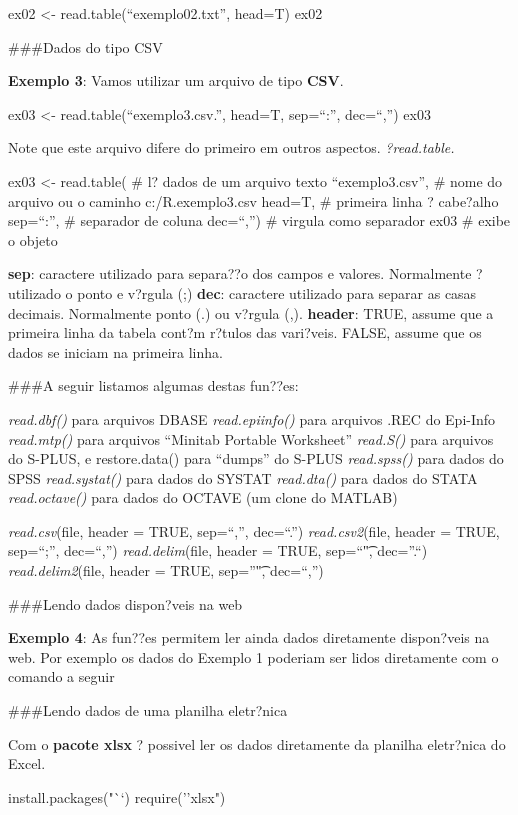 \documentclass[]{book}
\begin{document}
ex02 \textless{}- read.table(``exemplo02.txt'', head=T)
ex02

\#\#\#Dados do tipo CSV

\textbf{Exemplo 3}: Vamos utilizar um arquivo de tipo \textbf{CSV}.

ex03 \textless{}- read.table(``exemplo3.csv.'', head=T, sep=``:'', dec=``,'')
ex03

Note que este arquivo difere do primeiro em outros aspectos.
\emph{?read.table.}

ex03 \textless{}- read.table( \# l? dados de um arquivo texto
``exemplo3.csv'', \# nome do arquivo ou o caminho c:/R.exemplo3.csv
head=T, \# primeira linha ? cabe?alho
sep=``:'', \# separador de coluna
dec=``,'') \# virgula como separador
ex03 \# exibe o objeto

\textbf{sep}: caractere utilizado para separa??o dos campos e valores. Normalmente ? utilizado o ponto e v?rgula (;)
\textbf{dec}: caractere utilizado para separar as casas decimais. Normalmente ponto (.) ou v?rgula (,).
\textbf{header}: TRUE, assume que a primeira linha da tabela cont?m r?tulos das vari?veis. FALSE, assume que os dados se iniciam na primeira linha.

\#\#\#A seguir listamos algumas destas fun??es:

\emph{read.dbf()} para arquivos DBASE
\emph{read.epiinfo()} para arquivos .REC do Epi-Info
\emph{read.mtp()} para arquivos ``Minitab Portable Worksheet''
\emph{read.S()} para arquivos do S-PLUS, e restore.data() para ``dumps'' do S-PLUS
\emph{read.spss()} para dados do SPSS
\emph{read.systat()} para dados do SYSTAT
\emph{read.dta()} para dados do STATA
\emph{read.octave()} para dados do OCTAVE (um clone do MATLAB)

\emph{read.csv}(file, header = TRUE, sep=``,'', dec=``.'')
\emph{read.csv2}(file, header = TRUE, sep=``;'', dec=``,'')
\emph{read.delim}(file, header = TRUE, sep=``\t", dec=''.``)
\emph{read.delim2}(file, header = TRUE, sep=''\t", dec=``,'')

\#\#\#Lendo dados dispon?veis na web

\textbf{Exemplo 4}: As fun??es permitem ler ainda dados diretamente dispon?veis na web. Por exemplo os dados do Exemplo 1 poderiam ser lidos diretamente com o comando a seguir

\#\#\#Lendo dados de uma planilha eletr?nica

Com o \textbf{pacote xlsx} ? possivel ler os dados diretamente da planilha eletr?nica do Excel.

install.packages("``)
require(''xlsx")
\end{document}
